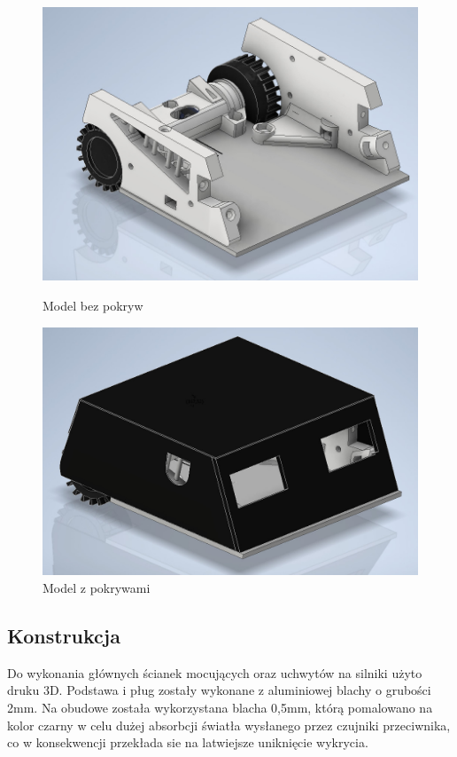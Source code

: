 \documentclass[polish,polish,a4paper]{article}
\begin{document}
        \begin{figure}[!htb]
       \begin{minipage}{0.3\textwidth}
         \centering
         \includegraphics[width=1.55\linewidth]{photo/bez_pokryw.jpg}
         \caption{Model bez pokryw}\label{Fig:Data1}
       \end{minipage}\hspace{30mm}
       \begin{minipage}{0.3\textwidth}
         \centering
         \includegraphics[width=1.69\linewidth]{photo/z_pokrywami.jpg}
         \caption{Model z pokrywami}\label{Fig:Data2}
       \end{minipage}
        \end{figure}
    
    
    \subsection{Konstrukcja}
        Do wykonania głównych ścianek mocujących oraz uchwytów na silniki użyto druku 3D. 
        Podstawa i pług zostały wykonane z aluminiowej blachy o grubości 2mm. Na obudowe została wykorzystana blacha 0,5mm, którą pomalowano na kolor czarny w celu dużej absorbcji światła wysłanego przez czujniki przeciwnika, co w konsekwencji przekłada sie na latwiejsze uniknięcie wykrycia. 
\end{document}
